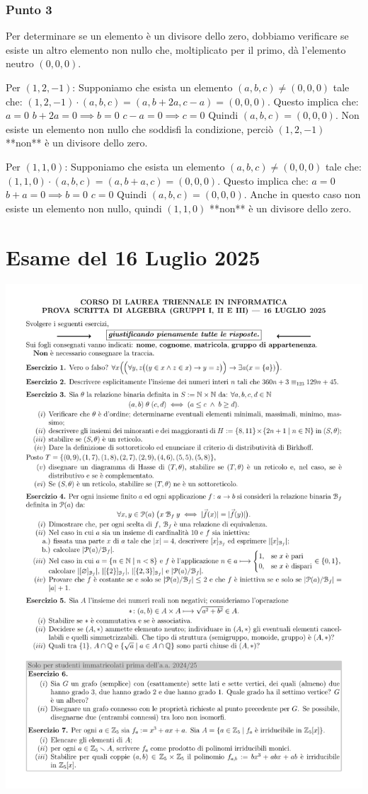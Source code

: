 \subsubsection*{Punto 3}
Per determinare se un elemento è un divisore dello zero, dobbiamo verificare se esiste un altro elemento non nullo che, moltiplicato per il primo, dà l'elemento neutro $(0,0,0)$.

Per $(1, 2, -1)$:
Supponiamo che esista un elemento $(a, b, c) \ne (0, 0, 0)$ tale che:
$(1, 2, -1) \cdot (a, b, c) = (a, b+2a, c-a) = (0, 0, 0)$.
Questo implica che:
$a = 0$
$b + 2a = 0 \implies b=0$
$c - a = 0 \implies c=0$
Quindi $(a, b, c) = (0, 0, 0)$. Non esiste un elemento non nullo che soddisfi la condizione, perciò $(1, 2, -1)$ **non** è un divisore dello zero.

Per $(1, 1, 0)$:
Supponiamo che esista un elemento $(a, b, c) \ne (0, 0, 0)$ tale che:
$(1, 1, 0) \cdot (a, b, c) = (a, b+a, c) = (0, 0, 0)$.
Questo implica che:
$a = 0$
$b + a = 0 \implies b=0$
$c = 0$
Quindi $(a, b, c) = (0, 0, 0)$. Anche in questo caso non esiste un elemento non nullo, quindi $(1, 1, 0)$ **non** è un divisore dello zero.

\section{Esame del 16 Luglio 2025}
\begin{center}
	\includegraphics[scale=.85]{pdf/25-07-16.pdf}
\end{center}

